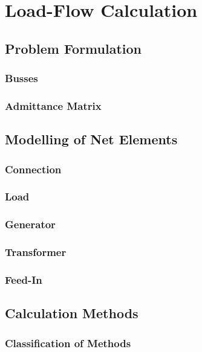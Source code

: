 \chapter{Load-Flow Calculation}

\section{Problem Formulation}

\subsection{Busses}

\subsection{Admittance Matrix}

\section{Modelling of Net Elements}

\subsection{Connection}

\subsection{Load}

\subsection{Generator}

\subsection{Transformer}

\subsection{Feed-In}

\section{Calculation Methods}

\subsection{Classification of Methods}

